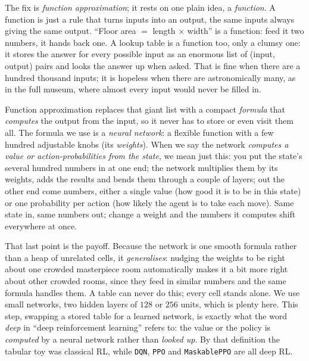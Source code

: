 \documentclass[11pt]{article}
\newcommand{\key}[1]{\textit{#1}}            %
\begin{document}
The fix is \key{function approximation}; it rests on one plain idea, a \emph{function}. A function
is just a rule that turns inputs into an output, the same inputs always giving the same output. ``Floor
area $=$ length $\times$ width'' is a function: feed it two numbers, it hands back one. A lookup table is
a function too, only a clumsy one: it stores the answer for every possible input as an enormous list of
(input, output) pairs and looks the answer up when asked. That is fine when there are a hundred thousand
inputs; it is hopeless when there are astronomically many, as in the full museum, where almost every
input would never be filled in.

Function approximation replaces that giant list with a compact \emph{formula} that \emph{computes} the
output from the input, so it never has to store or even visit them all. The formula we use is a
\key{neural network}: a flexible function with a few hundred adjustable knobs (its \key{weights}). When
we say the network \emph{computes a value or action-probabilities from the state}, we mean just this:
you put the state's several hundred numbers in at one end; the network multiplies them by its weights,
adds the results and bends them through a couple of layers; out the other end come numbers, either a
single value (how good it is to be in this state) or one probability per action (how likely the agent is
to take each move). Same state in, same numbers out; change a weight and the numbers it computes shift
everywhere at once.

That last point is the payoff. Because the network is one smooth formula rather than a heap of unrelated
cells, it \key{generalises}: nudging the weights to be right about one crowded masterpiece room
automatically makes it a bit more right about other crowded rooms, since they feed in similar numbers
and the same formula handles them. A table can never do this; every cell stands alone. We use small
networks, two hidden layers of $128$ or $256$ units, which is plenty here. This step, swapping a stored
table for a learned network, is exactly what the word \emph{deep} in ``deep reinforcement learning''
refers to: the value or the policy is \emph{computed} by a neural network rather than \emph{looked up}.
By that definition the tabular toy was classical RL, while \texttt{DQN}, \texttt{PPO} and
\texttt{MaskablePPO} are all deep RL.
\end{document}
